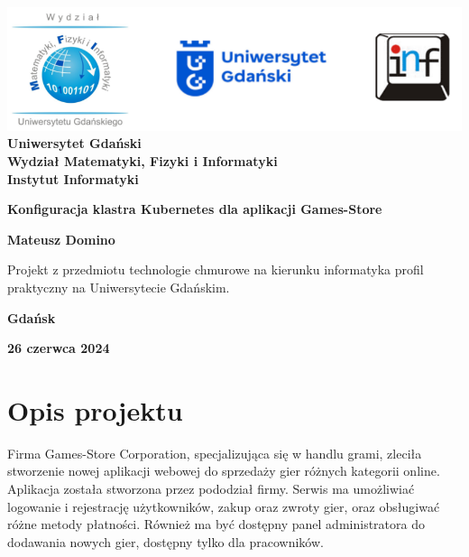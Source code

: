 \documentclass[12pt,a4paper]{article}
\newcommand{\hmwkTitle}{Konfiguracja klastra Kubernetes dla aplikacji Games-Store} %
\newcommand{\hmwkAuthorName}{Mateusz Domino} %
\begin{document}
\begin{titlepage}
    \vfill
	\begin{center}
	\hspace*{-1cm}
	\vspace*{0.5cm}
    \includegraphics[scale=0.55]{imagens/loga.png}\\
	\textbf{Uniwersytet Gdański \\ [0.05cm]Wydział Matematyki, Fizyki i Informatyki \\ [0.05cm] Instytut Informatyki}

	\vspace{0.6cm}
	\vspace{4cm}
	{\huge \textbf{\hmwkTitle}}\vspace{8mm}
	
	{\large \textbf{\hmwkAuthorName}}\\[3cm]
	
		\hspace{.45\textwidth} %
	   \begin{minipage}{.5\textwidth}
	   Projekt z przedmiotu technologie chmurowe na kierunku informatyka profil praktyczny na Uniwersytecie Gdańskim.\\[0.1cm]
	  \end{minipage}
	  \vfill
	
	\textbf{Gdańsk}

	\textbf{26 czerwca 2024}
	\end{center}
	
\end{titlepage}

\newpage
\setcounter{secnumdepth}{5}
\tableofcontents
\newpage

\section{Opis projektu}
\label{sec:Project}

Firma Games-Store Corporation, specjalizująca się w handlu grami, zleciła stworzenie nowej aplikacji webowej do sprzedaży gier różnych kategorii online. Aplikacja została stworzona przez pododział firmy. Serwis ma umożliwiać logowanie i rejestrację użytkowników, zakup oraz zwroty gier, oraz obsługiwać różne metody płatności. Również ma być dostępny panel administratora do dodawania nowych gier, dostępny tylko dla pracowników.
\end{document}
